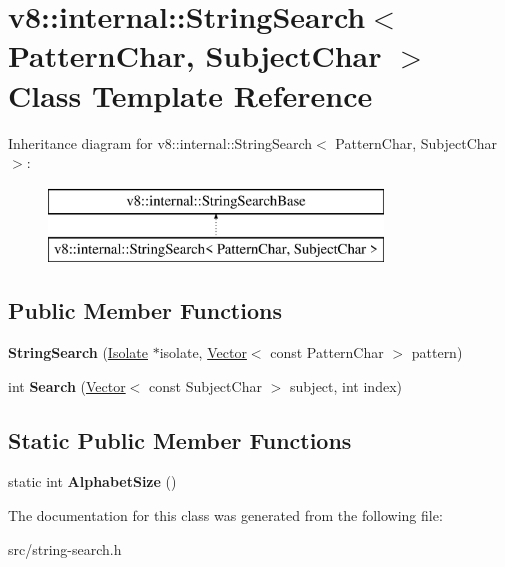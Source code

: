 \hypertarget{classv8_1_1internal_1_1_string_search}{}\section{v8\+:\+:internal\+:\+:String\+Search$<$ Pattern\+Char, Subject\+Char $>$ Class Template Reference}
\label{classv8_1_1internal_1_1_string_search}
Inheritance diagram for v8\+:\+:internal\+:\+:String\+Search$<$ Pattern\+Char, Subject\+Char $>$\+:\begin{figure}[H]
\begin{center}
\leavevmode
\includegraphics[height=2.000000cm]{classv8_1_1internal_1_1_string_search}
\end{center}
\end{figure}
\subsection*{Public Member Functions}
\begin{DoxyCompactItemize}
\item 
\hypertarget{classv8_1_1internal_1_1_string_search_ac85cd7d81456c38b54ca0dd30232294e}{}{\bfseries String\+Search} (\hyperlink{classv8_1_1internal_1_1_isolate}{Isolate} $\ast$isolate, \hyperlink{classv8_1_1internal_1_1_vector}{Vector}$<$ const Pattern\+Char $>$ pattern)\label{classv8_1_1internal_1_1_string_search_ac85cd7d81456c38b54ca0dd30232294e}

\item 
\hypertarget{classv8_1_1internal_1_1_string_search_ad1e65aa301ab863ab3150ca02d6dfdc2}{}int {\bfseries Search} (\hyperlink{classv8_1_1internal_1_1_vector}{Vector}$<$ const Subject\+Char $>$ subject, int index)\label{classv8_1_1internal_1_1_string_search_ad1e65aa301ab863ab3150ca02d6dfdc2}

\end{DoxyCompactItemize}
\subsection*{Static Public Member Functions}
\begin{DoxyCompactItemize}
\item 
\hypertarget{classv8_1_1internal_1_1_string_search_a2fa4be83d94f58d7804f6db7f8ca484d}{}static int {\bfseries Alphabet\+Size} ()\label{classv8_1_1internal_1_1_string_search_a2fa4be83d94f58d7804f6db7f8ca484d}

\end{DoxyCompactItemize}


The documentation for this class was generated from the following file\+:\begin{DoxyCompactItemize}
\item 
src/string-\/search.\+h\end{DoxyCompactItemize}
